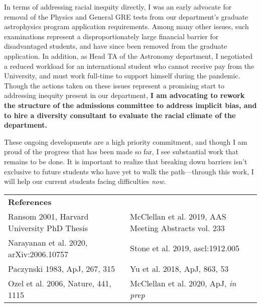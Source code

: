 \documentclass[11pt]{article}
\begin{document}
In terms of addressing racial inequity directly, I was an early advocate for removal of the Physics and General GRE tests from our department's graduate astrophysics program application requirements. Among many other issues, such examinations represent a disproportionately large financial barrier for disadvantaged students, and have since been removed from the graduate application. In addition, as Head TA of the Astronomy department, I negotiated a reduced workload for an international student who cannot receive pay from the University, and must work full-time to support himself during the pandemic. Though the actions taken on these issues represent a promising start to addressing inequity present in our department, \textbf{I am advocating to rework the structure of the admissions committee to address implicit bias, and to hire a diversity consultant to evaluate the racial climate of the department.} 

These ongoing developments are a high priority commitment, and though I am proud of the progress that has been made so far, I see substantial work that remains to be done. It is important to realize that breaking down barriers isn't exclusive to future students who have yet to walk the path---through this work, I will help our current students facing difficulties \textit{now}.

\thispagestyle{empty}
\vspace{0.45cm}
\begin{adjustbox}{}
\begin{tabular}{ll}
    \textbf{References} \\
    Ransom 2001, Harvard University PhD Thesis &
    McClellan et al. 2019, AAS Meeting Abstracts vol. 233\\
    Narayanan et al. 2020, arXiv:2006.10757 &
    Stone et al. 2019, ascl:1912.005\\
    Paczynski 1983, ApJ, 267, 315 &
    Yu et al. 2018, ApJ, 863, 53\\
    Ozel et al. 2006, Nature, 441, 1115&
    McClellan et al. 2020, ApJ, \textit{in prep}
\end{tabular}
\end{adjustbox}


%
%
\end{document}
